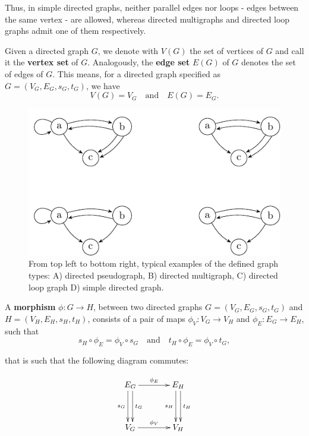 Thus, in simple directed graphs, neither parallel edges nor loops -
edges between the same vertex - are allowed, whereas directed
multigraphs and directed loop graphs admit one of them respectively.


Given a directed graph $G$, we denote with $V(G)$ the set of vertices
of $G$ and call it the \textbf{vertex set} of $G$. Analogously, the
\textbf{edge set} $E(G)$ of $G$ denotes the set of edges of $G$. This
means, for a directed graph specified as $G = (V_G,E_G,s_G,t_G)$, we
have \[V(G) = V_G \quad \mathrm{and} \quad E(G) = E_G.\]


\begin{figure}
  \includegraphics{gfx/tikz/directed_graph_types.pdf}
  \caption{From top left to bottom right, typical examples of the
    defined graph types: A) directed pseudograph, B) directed
    multigraph, C) directed loop graph D) simple directed
    graph.} \label{fig:M1}
\end{figure}


A \textbf{morphism} $\phi: G \to H$, between two directed graphs
$G=(V_G,E_G,s_G,t_G)$ and $H=(V_H,E_H,s_H,t_H)$, consists of a pair of
maps $\phi_V: V_G \to V_H$ and $\phi_E: E_G \to E_H$, such that
\[
s_H \circ \phi_E = \phi_V \circ s_G \mathrm{\quad and \quad} t_H \circ
\phi_E = \phi_V \circ t_G,
\]

that is such that the following diagram commutes:

\begin{align*} 
  \xymatrix@+=1.3cm{E_G \ar^{t_G}@<0.66ex>[d] \ar_{s_G}@<-0.66ex>[d]
    \ar^{\phi_E}[r] & E_H \ar^{t_H}@<0.66ex>[d]
    \ar_{s_H}@<-0.66ex>[d]\\ V_G \ar^{\phi_V}[r] & V_H}
\end{align*}

